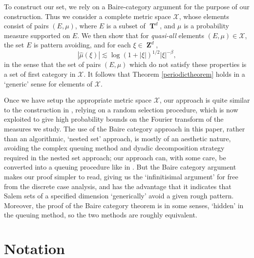 \documentclass[12pt,reqno]{article}
\DeclareMathOperator{\ZZ}{\mathbf{Z}}
\DeclareMathOperator{\TT}{\mathbf{T}}
\begin{document}
To construct our set, we rely on a Baire-category argument for the purpose of our construction. Thus we consider a complete metric space $\mathcal{X}$, whose elements consist of pairs $(E,\mu)$, where $E$ is a subset of $\TT^d$, and $\mu$ is a probability measure supported on $E$. We then show that for \emph{quasi-all} elements $(E,\mu) \in \mathcal{X}$, the set $E$ is pattern avoiding, and for each $\xi \in \ZZ^d$,
%
\[ |\widehat{\mu}(\xi)| \lesssim \log(1 + |\xi|)^{1/2} |\xi|^{-\beta}, \]
%
in the sense that the set of pairs $(E,\mu)$ which do not satisfy these properties is a set of first category in $\mathcal{X}$. It follows that Theorem \ref{periodictheorem} holds in a `generic' sense for elements of $\mathcal{X}$.

Once we have setup the appropriate metric space $\mathcal{X}$, our approach is quite similar to the construction in \cite{OurPaper}, relying on a random selection procedure, which is now exploited to give high probability bounds on the Fourier transform of the measures we study. The use of the Baire category approach in this paper, rather than an algorithmic, `nested set' approach, is mostly of an aesthetic nature, avoiding the complex queuing method and dyadic decomposition strategy required in the nested set approach; our approach can, with some care, be converted into a queuing procedure like in \cite{OurPaper}. But the Baire category argument makes our proof simpler to read, giving us the `infinitisimal argument' for free from the discrete case analysis, and has the advantage that it indicates that Salem sets of a specified dimension `generically' avoid a given rough pattern. Moreover, the proof of the Baire category theorem is in some senses, `hidden' in the queuing method, so the two methods are roughly equivalent.

\section{Notation} \label{notationSection}
\end{document}
